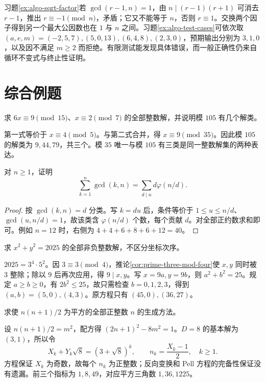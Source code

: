 \documentclass[UTF8,12pt,a4paper,fontset=fandol]{ctexbook}
\begin{document}
习题\ref{ex:algo-sqrt-factor}若 $\gcd(r-1,n)=1$，由 $n\mid(r-1)(r+1)$ 可消去 $r-1$，推出 $r\equiv-1\pmod n$，矛盾；它又不能等于 $n$，否则 $r\equiv1$。交换两个因子得到另一个最大公因数也在 $1$ 与 $n$ 之间。习题\ref{ex:algo-test-cases}可依次取 $(a,e,m)=(-2,5,7),(5,0,13),(6,4,8),(2,3,0)$，预期输出分别为 $3,1,0$，以及因不满足 $m\ge2$ 而拒绝。有限测试能发现具体错误，而一般正确性仍来自循环不变式与终止性证明。

\section{综合例题}

\begin{example}[同余化简与解数]
求 $6x\equiv9\pmod{15}$、$x\equiv2\pmod7$ 的全部整数解，并说明模 $105$ 有几个解类。
\end{example}
\begin{solve}
第一式等价于 $x\equiv4\pmod5$。与第二式合并，得 $x\equiv9\pmod{35}$。因此模 $105$ 的解类为 $9,44,79$，共三个。模 $35$ 唯一与模 $105$ 有三类是同一整数解集的两种表达。
\end{solve}

\begin{example}[最大公因数的求和]
对 $n\ge1$，证明
\[
 \sum_{k=1}^n\gcd(k,n)=\sum_{d\mid n}d\varphi(n/d).
\]
\end{example}
\begin{proof}
按 $\gcd(k,n)=d$ 分类。写 $k=du$ 后，条件等价于 $1\le u\le n/d$、$\gcd(u,n/d)=1$，故该类含 $\varphi(n/d)$ 个数，每个贡献 $d$。对全部正约数求和即可。例如 $n=12$ 时，右侧为 $4+4+6+8+6+12=40$。
\end{proof}

\begin{example}[平方和的全部表示]
求 $x^2+y^2=2025$ 的全部非负整数解，不区分坐标次序。
\end{example}
\begin{solve}
$2025=3^4\cdot5^2$。因 $3\equiv3\pmod4$，推论\ref{cor:prime-three-mod-four}使 $x,y$ 同时被 $3$ 整除；除以 $9$ 后再次应用，得 $9\mid x,y$。写 $x=9a,y=9b$，则 $a^2+b^2=25$。规定 $a\ge b\ge0$，有 $2b^2\le25$，故只需检查 $b=0,1,2,3$，得到 $(a,b)=(5,0),(4,3)$。原方程只有 $(45,0),(36,27)$。
\end{solve}

\begin{example}[平方三角数]
求使 $n(n+1)/2$ 为平方的全部正整数 $n$ 的生成方法。
\end{example}
\begin{solve}
设 $n(n+1)/2=m^2$，配方得 $(2n+1)^2-8m^2=1$。$D=8$ 的基本解为 $(3,1)$，所以令
\[
 X_k+Y_k\sqrt8=(3+\sqrt8)^k,\qquad
 n_k=\frac{X_k-1}{2},\quad k\ge1.
\]
方程保证 $X_k$ 为奇数，故每个 $n_k$ 为正整数；反向变换和 Pell 方程的完备性保证没有遗漏。前三个指标为 $1,8,49$，对应平方三角数 $1,36,1225$。
\end{solve}
\end{document}
